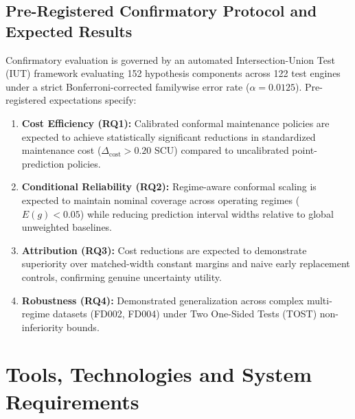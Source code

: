 \documentclass[12pt,a4paper]{article}
\begin{document}
\subsection{Pre-Registered Confirmatory Protocol and Expected Results}
Confirmatory evaluation is governed by an automated Intersection-Union Test (IUT) framework evaluating 152 hypothesis components across 122 test engines under a strict Bonferroni-corrected familywise error rate ($\alpha=0.0125$). Pre-registered expectations specify:
\begin{enumerate}[label=(\alph*)]
    \item \textbf{Cost Efficiency (RQ1):} Calibrated conformal maintenance policies are expected to achieve statistically significant reductions in standardized maintenance cost ($\Delta_{\text{cost}} > 0.20$ SCU) compared to uncalibrated point-prediction policies.
    \item \textbf{Conditional Reliability (RQ2):} Regime-aware conformal scaling is expected to maintain nominal coverage across operating regimes ($E(g) < 0.05$) while reducing prediction interval widths relative to global unweighted baselines.
    \item \textbf{Attribution (RQ3):} Cost reductions are expected to demonstrate superiority over matched-width constant margins and naive early replacement controls, confirming genuine uncertainty utility.
    \item \textbf{Robustness (RQ4):} Demonstrated generalization across complex multi-regime datasets (FD002, FD004) under Two One-Sided Tests (TOST) non-inferiority bounds.
\end{enumerate}

\section{Tools, Technologies and System Requirements}
\end{document}
